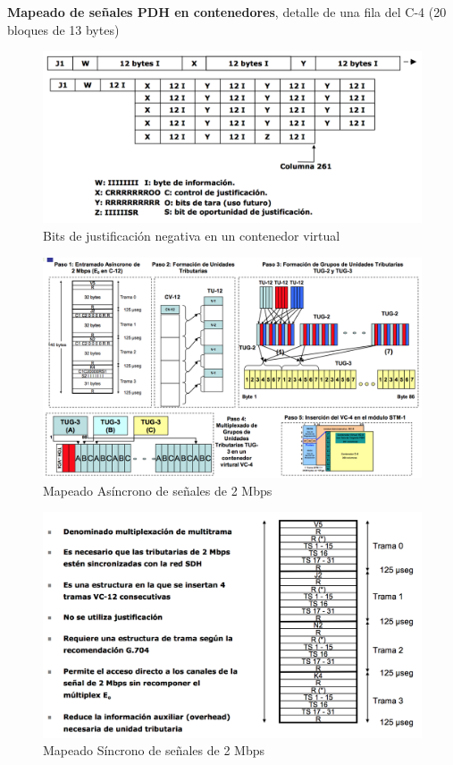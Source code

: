 \documentclass[10pt,portrait, twocolumn]{article}
\begin{document}
\textbf{Mapeado de señales PDH en contenedores}, detalle de una fila del C-4 (20 bloques de 13 bytes)

	\begin{figure}[!ht]
 		\centering
  		 \includegraphics[scale = 0.4]{images/PDHCont}
		\caption{Bits de justificación negativa en un contenedor virtual}
	\end{figure}
	
	\begin{figure}[!ht]
 		\centering
  		 \includegraphics[scale = 0.4]{images/Mapeado}
		\caption{Mapeado Asíncrono de señales de 2 Mbps}
	\end{figure}
	
	\begin{figure}[!ht]
 		\centering
  		 \includegraphics[scale = 0.4]{images/Mapeado2}
		\caption{Mapeado Síncrono de señales de 2 Mbps}
	\end{figure}
\end{document}
